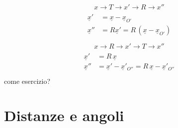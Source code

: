 \documentclass[letterpaper,10pt,english]{jupyterBook}
\begin{document}
\sphinxAtStartPar
{} 
\begin{equation*}
\begin{split} x \rightarrow T \rightarrow x' \rightarrow R \rightarrow x''\end{split}
\end{equation*}\begin{equation*}
\begin{split}\begin{aligned}
\underline{x}' & = \underline{x} - \underline{x}_{O'} \\
\underline{x}'' & = R \underline{x}' = R \, (\underline{x} - \underline{x}_{O'}) \\
\end{aligned}\end{split}
\end{equation*}\begin{equation*}
\begin{split} x \rightarrow R \rightarrow x' \rightarrow T \rightarrow x''\end{split}
\end{equation*}\begin{equation*}
\begin{split}\begin{aligned}
\underline{x}'  & = R \, \underline{x}  \\
\underline{x}'' & = \underline{x}' - \underline{x}'_{O''} = R \, \underline{x} - \underline{x}'_{O''} \\ 
\end{aligned}\end{split}
\end{equation*}
\sphinxAtStartPar
{}  come esercizio?

\sphinxstepscope


\section{Distanze e angoli}
\label{\detokenize{ch/analytic_geometry/analytic_geometry_2d/points:distanze-e-angoli}}\label{\detokenize{ch/analytic_geometry/analytic_geometry_2d/points:geometry-analytic-2d-points}}\label{\detokenize{ch/analytic_geometry/analytic_geometry_2d/points::doc}}
\end{document}
